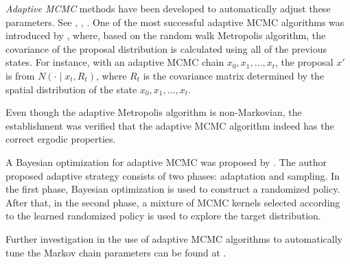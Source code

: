 
\textit{Adaptive MCMC} methods have been developed to automatically adjust these parameters. See \eg \cite{andrieu2008tutorial}, \cite{atchade2009adaptive}, \cite{roberts2009examples}. One of the most successful adaptive MCMC algorithms was introduced by \cite{haario2001adaptive}, where, based on the  random walk Metropolis algorithm, the covariance of the proposal distribution is calculated using all of the previous states. For instance, with an adaptive MCMC chain $x_0,x_1,\ldots,x_t$, the proposal $x'$ is from $N(\cdot\mid x_t,R_t)$, where $R_t$ is the covariance matrix determined by the spatial distribution of the state $x_0,x_1,\ldots,x_t$. 

Even though the adaptive Metropolis algorithm is non-Markovian, the establishment was verified that the adaptive MCMC algorithm indeed has the correct ergodic properties. 

A Bayesian optimization for adaptive MCMC was proposed by \cite{mahendran2012adaptive}. The author proposed adaptive strategy consists of two phases: adaptation and sampling. In the first phase, Bayesian optimization is used to construct a randomized policy. After that, in the second phase,  a mixture of MCMC kernels selected according to the learned randomized policy is used to explore the target distribution. 

Further investigation in the use of adaptive MCMC algorithms to automatically
tune the Markov chain parameters can be found at \cite{roberts2009examples}. 


